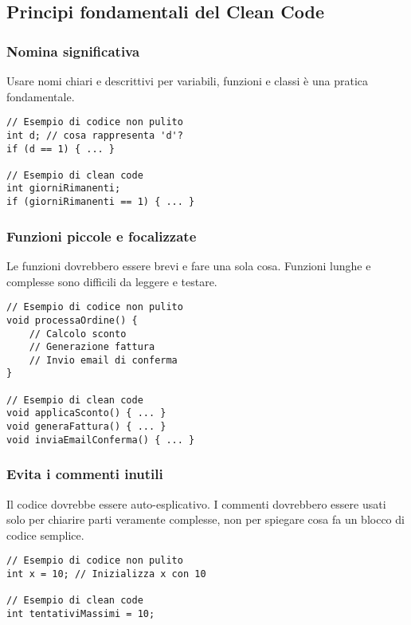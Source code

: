 \documentclass{article}
\begin{document}
\subsection{Principi fondamentali del Clean Code}

\subsubsection{Nomina significativa}
Usare nomi chiari e descrittivi per variabili, funzioni e classi è una pratica fondamentale.
\begin{lstlisting}
// Esempio di codice non pulito
int d; // cosa rappresenta 'd'?
if (d == 1) { ... }

// Esempio di clean code
int giorniRimanenti;
if (giorniRimanenti == 1) { ... }
\end{lstlisting}

\subsubsection{Funzioni piccole e focalizzate}
Le funzioni dovrebbero essere brevi e fare una sola cosa. Funzioni lunghe e complesse sono difficili da leggere e testare.
\begin{lstlisting}
// Esempio di codice non pulito
void processaOrdine() {
    // Calcolo sconto
    // Generazione fattura
    // Invio email di conferma
}

// Esempio di clean code
void applicaSconto() { ... }
void generaFattura() { ... }
void inviaEmailConferma() { ... }
\end{lstlisting}

\subsubsection{Evita i commenti inutili}
Il codice dovrebbe essere auto-esplicativo. I commenti dovrebbero essere usati solo per chiarire parti veramente complesse, non per spiegare cosa fa un blocco di codice semplice.
\begin{lstlisting}
// Esempio di codice non pulito
int x = 10; // Inizializza x con 10

// Esempio di clean code
int tentativiMassimi = 10;
\end{lstlisting}
\end{document}
